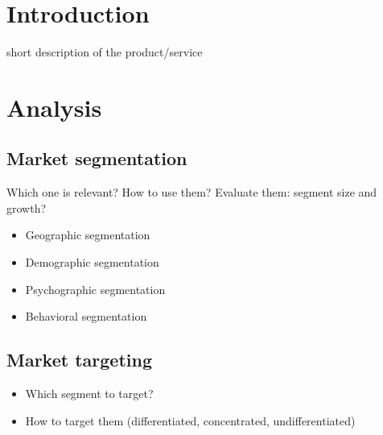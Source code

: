 

\newcommand\Title{Group Assignment}
\newcommand\Date{\today}
\newcommand\Name{Ádám Kohajda \\ Dániel Nagy \\ József Szenka \\ László Kocsis \\ Zoltán Hafner}
\newcommand\Course{Marketing}
\newcommand\Neptun{BMEGT20MW01}
\newcommand\CourseNeptun{BMEGT20MW01}






\section{Introduction}
short description of the product/service

\section{Analysis}
\subsection{Market segmentation}

Which one is relevant? How to use them? Evaluate them: segment size and growth?
\begin{itemize}
   \item Geographic segmentation
   \item Demographic segmentation
   \item Psychographic segmentation
   \item Behavioral segmentation
\end{itemize}

\subsection{Market targeting}

\begin{itemize}
   \item Which segment to target?
   \item How to target them (differentiated, concentrated, undifferentiated)
\end{itemize}

